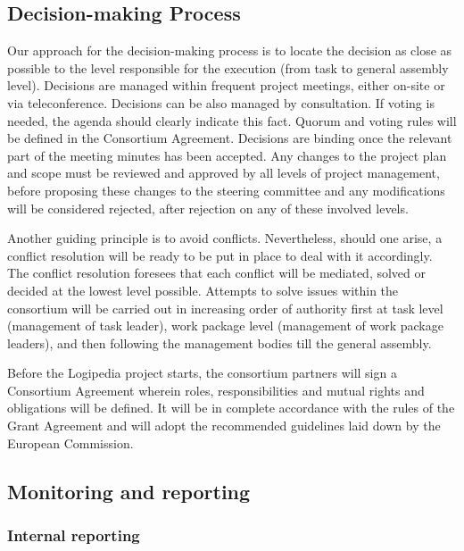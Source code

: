 \subsection*{Decision-making Process}

Our approach for the decision-making process is to locate the decision
as close as possible to the level responsible for the execution (from
task to general assembly level). Decisions are managed within
frequent project meetings, either on-site or via
teleconference. Decisions can be also managed by consultation. If
voting is needed, the agenda should clearly indicate this fact. Quorum
and voting rules will be defined in the Consortium
Agreement. Decisions are binding once the relevant part of the meeting
minutes has been accepted. Any changes to the project plan and scope
must be reviewed and approved by all levels of project management,
before proposing these changes to the steering committee and any
modifications will be considered rejected, after rejection on any of
these involved levels.

Another guiding principle is to avoid conflicts. Nevertheless, should
one arise, a conflict resolution will be ready to be put in place to
deal with it accordingly. The conflict resolution foresees that each
conflict will be mediated, solved or decided at the lowest level
possible. Attempts to solve issues within the consortium will be
carried out in increasing order of authority first at task level
(management of task leader), work package level (management of work
package leaders), and then following the management bodies till the
general assembly.

Before the Logipedia project starts, the consortium partners will sign
a Consortium Agreement wherein roles, responsibilities and mutual
rights and obligations will be defined. It will be in complete
accordance with the rules of the Grant Agreement and will adopt
the recommended guidelines laid down by the European Commission.

\subsection*{Monitoring and reporting}

\subsubsection*{Internal reporting}

